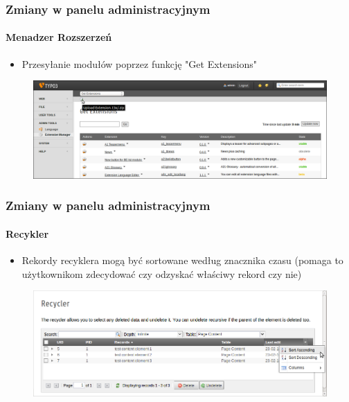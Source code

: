 
\begin{frame}[fragile]
	\frametitle{Zmiany w panelu administracyjnym}
	\framesubtitle{Menadzer Rozszerzeń}

 	\begin{itemize}
		\item Przesyłanie modułów poprzez funkcję "Get Extensions"
	\end{itemize}

	\begin{figure}
		\includegraphics[width=0.95\linewidth]{Images/BackendChanges/UploadExtension.png}
	\end{figure}

\end{frame}


\begin{frame}[fragile]
	\frametitle{Zmiany w panelu administracyjnym}
	\framesubtitle{Recykler}

 	\begin{itemize}
		\item Rekordy recyklera mogą być sortowane według znacznika czasu\newline
			\small(pomaga to użytkownikom zdecydować czy odzyskać właściwy rekord czy nie)\normalsize
	\end{itemize}

	\begin{figure}
		\includegraphics[width=0.95\linewidth]{Images/BackendChanges/RecyclerSortRecord.png}
	\end{figure}

\end{frame}


